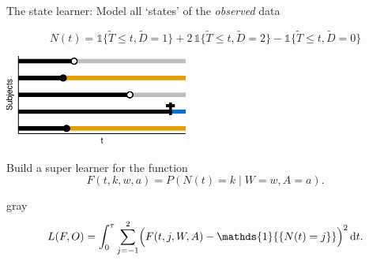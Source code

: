 \documentclass[smaller]{beamer}\usepackage{listings}
\newcommand*\diff{\mathop{}\!\mathrm{d}}
\newcommand{\1}{\mathds{1}}
\begin{document}
\begin{frame}[label={sec:org7089033}]{The state learner: Model all `states' of the \emph{observed} data}
\vspace{-1cm}

\begin{equation*}
  N(t) = \1{
    \{
      \tilde{T} \leq t, \tilde D=1
    \}} + 2\,\1{\{\tilde{T} \leq t, \tilde
    D=2\}} - \1{\{\tilde{T} \leq t, \tilde D=0\}}
\end{equation*}

\begin{center}
\includegraphics[width=0.45\textwidth]{./observed-multi-state.pdf}
\end{center}

\pause

Build a super learner for the function
\begin{equation*}
    F(t, k, w,a) = P(N(t) = k \mid W=w, A=a).
\end{equation*}

\pause \vspace{.2cm}

\begin{beamercolorbox}[rounded=true]{gray}
\begin{equation*}
  L(F,O) =  \int_0^{\tau} \sum_{j=-1}^{2}
  \Bigl(
    F(t,j,W,A) - \1{\{N(t)=j\}}
    \Bigr)^2
    \diff t.
\end{equation*}
\end{beamercolorbox}
\end{frame}
\end{document}
